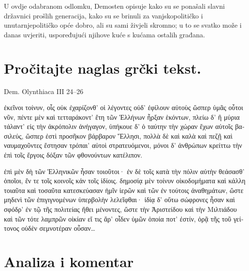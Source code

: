 U ovdje odabranom odlomku, Demosten opisuje kako su se ponašali slavni državnici prošlih generacija, kako su se brinuli za vanjskopolitičko i unutarnjepolitičko opće dobro, ali su sami živjeli skromno; u to se svatko može i danas uvjeriti, uspoređujući njihove kuće s kućama ostalih građana.



\section*{Pročitajte naglas grčki tekst.}

Dem. Olynthiaca III 24–26


\medskip


{\large

\begin{greek}

\noindent  ἐκεῖνοι τοίνυν, οἷς οὐκ ἐχαρίζονθ' οἱ λέγοντες οὐδ' ἐφίλουν αὐτοὺς ὥσπερ ὑμᾶς οὗτοι νῦν, πέντε μὲν καὶ τετταράκοντ' ἔτη τῶν Ἑλλήνων ἦρξαν ἑκόντων, πλείω δ' ἢ μύρια τάλαντ' εἰς τὴν ἀκρόπολιν ἀνήγαγον, ὑπήκουε δ' ὁ ταύτην τὴν χώραν ἔχων αὐτοῖς βασιλεύς, ὥσπερ ἐστὶ προσῆκον βάρβαρον Ἕλλησι, πολλὰ δὲ καὶ καλὰ καὶ πεζῇ καὶ ναυμαχοῦντες ἔστησαν τρόπαι' αὐτοὶ στρατευόμενοι, μόνοι δ' ἀνθρώπων κρείττω τὴν ἐπὶ τοῖς ἔργοις δόξαν τῶν φθονούντων κατέλιπον.

ἐπὶ μὲν δὴ τῶν Ἑλληνικῶν ἦσαν τοιοῦτοι· ἐν δὲ τοῖς κατὰ τὴν πόλιν αὐτὴν θεάσασθ' ὁποῖοι, ἔν τε τοῖς κοινοῖς κἀν τοῖς ἰδίοις. δημοσίᾳ μὲν τοίνυν οἰκοδομήματα καὶ κάλλη τοιαῦτα καὶ τοσαῦτα κατεσκεύασαν ἡμῖν ἱερῶν καὶ τῶν ἐν τούτοις ἀναθημάτων, ὥστε μηδενὶ τῶν ἐπιγιγνομένων ὑπερβολὴν λελεῖφθαι· ἰδίᾳ δ' οὕτω σώφρονες ἦσαν καὶ σφόδρ' ἐν τῷ τῆς πολιτείας ἤθει μένοντες, ὥστε τὴν Ἀριστείδου καὶ τὴν Μιλτιάδου καὶ τῶν τότε λαμπρῶν οἰκίαν εἴ τις ἄρ' οἶδεν ὑμῶν ὁποία ποτ' ἐστίν, ὁρᾷ τῆς τοῦ γείτονος οὐδὲν σεμνοτέραν οὖσαν\dots

\end{greek}

}


\section*{Analiza i komentar}


